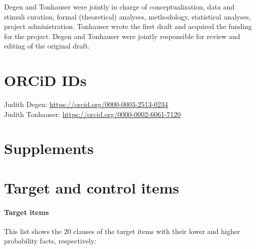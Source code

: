 \documentclass[11pt,fleqn]{article}
\newcommand{\6}{\mbox{$[\hspace*{-.6mm}[$}}
\newcommand{\9}{\mbox{$]\hspace*{-.6mm}]$}}
\renewcommand{\thefigure}{\textbf{\arabic{figure}}}
\renewcommand{\thetable}{\textbf{\arabic{table}}}
\begin{document}
Degen and Tonhauser were jointly in charge of conceptualization, data and stimuli curation, formal (theoretical) analyses, methodology, statistical analyses, project administration. Tonhauser wrote the first draft and acquired the funding for the project.  Degen and Tonhauser were jointly responsible for review and editing of the original draft.

\section*{ORCiD IDs}

Judith Degen: \url{https://orcid.org/0000-0003-2513-0234}
\\ Judith Tonhauser:  \url{https://orcid.org/0000-0002-6061-7120}





%



\newpage

\appendix

\setcounter{table}{0}
\renewcommand{\thetable}{A\arabic{table}}

\setcounter{figure}{0}
\renewcommand{\thefigure}{A\arabic{figure}}

\section*{Supplements}

\section{Target and control items}\label{a-stim}

\paragraph{Target items} This list shows the 20 clauses of the target items with their lower and higher probability facts, respectively:
\end{document}
